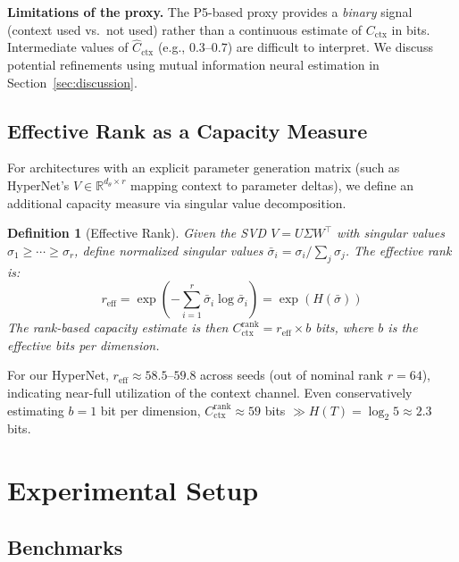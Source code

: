 \documentclass{article}
\newtheorem{definition}{Definition}
\begin{document}
\textbf{Limitations of the proxy.} The P5-based proxy provides a \emph{binary} signal (context used vs.\ not used) rather than a continuous estimate of $C_\mathrm{ctx}$ in bits. Intermediate values of $\hat{C}_\mathrm{ctx}$ (e.g., $0.3$--$0.7$) are difficult to interpret. We discuss potential refinements using mutual information neural estimation in Section~\ref{sec:discussion}.

\subsection{Effective Rank as a Capacity Measure}

For architectures with an explicit parameter generation matrix (such as HyperNet's $V \in \mathbb{R}^{d_\theta \times r}$ mapping context to parameter deltas), we define an additional capacity measure via singular value decomposition.

\begin{definition}[Effective Rank]
\label{def:eff_rank}
Given the SVD $V = U \Sigma W^\top$ with singular values $\sigma_1 \geq \cdots \geq \sigma_r$, define normalized singular values $\bar{\sigma}_i = \sigma_i / \sum_j \sigma_j$. The effective rank is:
\begin{equation}
    r_\mathrm{eff} = \exp\!\left(-\sum_{i=1}^{r} \bar{\sigma}_i \log \bar{\sigma}_i\right) = \exp(H(\bar{\sigma}))
\end{equation}
The rank-based capacity estimate is then $C_\mathrm{ctx}^\mathrm{rank} = r_\mathrm{eff} \times b$ bits, where $b$ is the effective bits per dimension.
\end{definition}

For our HyperNet, $r_\mathrm{eff} \approx 58.5$--$59.8$ across seeds (out of nominal rank $r = 64$), indicating near-full utilization of the context channel. Even conservatively estimating $b = 1$ bit per dimension, $C_\mathrm{ctx}^\mathrm{rank} \approx 59$ bits $\gg H(T) = \log_2 5 \approx 2.3$ bits.


\section{Experimental Setup}
\label{sec:setup_full}

\subsection{Benchmarks}
\end{document}
